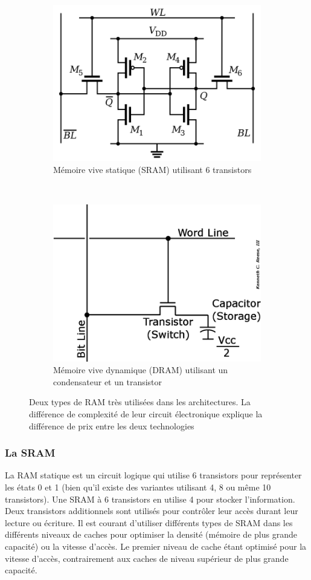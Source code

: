 \begin{figure}
    \begin{subfigure}[]{0.48\linewidth}\centering
        \includegraphics[width=0.60\linewidth]{images/processeurs_porte_sram.png}
        \caption{Mémoire vive statique (SRAM) utilisant 6 transistors}
        \label{pic_processeurs_porte_sram}
    \end{subfigure}
    ~ %
    \begin{subfigure}[]{0.48\linewidth}\centering
        \includegraphics[width=0.60\linewidth]{images/processeurs_porte_dram.png}
        \caption{Mémoire vive dynamique (DRAM) utilisant un condensateur et un transistor}
        \label{pic_processeurs_porte_sram}
    \end{subfigure}
    \caption{Deux types de RAM très utilisées dans les architectures. La différence de complexité de leur circuit électronique explique la différence de prix entre les deux technologies}
    \label{fig_processeurs_ram}
\end{figure}

\subsubsection{La SRAM} 
La RAM statique est un circuit logique qui utilise 6 transistors pour représenter les états 0 et 1 (bien qu'il existe des variantes utilisant 4, 8 ou même 10 transistors). Une SRAM à 6 transistors en utilise 4 pour stocker l'information. Deux transistors additionnels sont utilisés pour contrôler leur accès durant leur lecture ou écriture.
Il est courant d'utiliser différents types de SRAM dans les différents niveaux de caches pour optimiser la densité (mémoire de plus grande capacité) ou la vitesse d'accès. Le premier niveau de cache étant optimisé pour la vitesse d'accès, contrairement aux caches de niveau supérieur de plus grande capacité.


